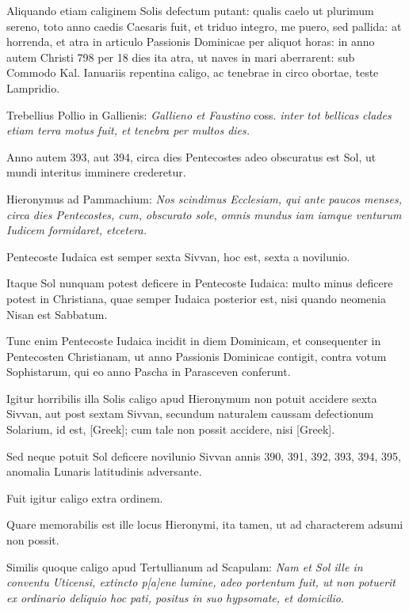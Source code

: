 \begin{parnumbers}
Aliquando etiam caliginem Solis defectum putant: qualis caelo ut plurimum
sereno, toto anno caedis Caesaris fuit, et triduo integro, me puero,
sed pallida: at horrenda, et atra in articulo Passionis Dominicae
per aliquot horas: in anno autem Christi 798 per 18 dies ita atra, ut
naves in mari aberrarent: sub Commodo Kal. Ianuariis repentina caligo,
ac tenebrae in circo obortae, teste Lampridio.

Trebellius Pollio in
Gallienis: \textit{Gallieno et Faustino}
 coss. \textit{inter tot bellicas clades etiam terra
motus fuit, et tenebra per multos dies.}

Anno autem 393, aut 394, circa
dies Pentecostes adeo obscuratus est Sol, ut mundi interitus imminere
crederetur.

Hieronymus ad Pammachium: \textit{Nos scindimus Ecclesiam,
qui ante paucos menses, circa dies Pentecostes, cum, obscurato
sole, omnis mundus iam iamque venturum Iudicem formidaret, etcetera.}

Pentecoste Iudaica est semper sexta Sivvan, hoc est, sexta a novilunio.

Itaque Sol nunquam potest deficere in Pentecoste Iudaica: multo minus
deficere potest in Christiana, quae semper Iudaica posterior est, nisi
quando neomenia Nisan est Sabbatum.

Tunc enim Pentecoste Iudaica
incidit in diem Dominicam, et consequenter in Pentecosten Christianam,
ut anno Passionis Dominicae contigit, contra votum Sophistarum,
qui eo anno Pascha in Parasceven conferunt.

Igitur horribilis
illa Solis caligo apud Hieronymum non potuit accidere sexta Sivvan,
aut post sextam Sivvan, secundum naturalem caussam defectionum
Solarium, id est, \textgreek{[Greek]}; cum tale non possit
accidere, nisi \textgreek{[Greek]}.

Sed neque potuit Sol deficere novilunio
Sivvan annis 390, 391, 392, 393, 394, 395, anomalia Lunaris latitudinis
adversante.

Fuit igitur caligo extra ordinem.

Quare memorabilis
est ille locus Hieronymi, ita tamen, ut ad characterem adsumi non
possit.

Similis quoque caligo apud Tertullianum ad Scapulam: \textit{Nam et
Sol ille in conventu Uticensi, extincto p[a]ene lumine, adeo portentum fuit, ut
non potuerit ex ordinario deliquio hoc pati, positus in suo hypsomate, et
domicilio}.


\end{parnumbers}

